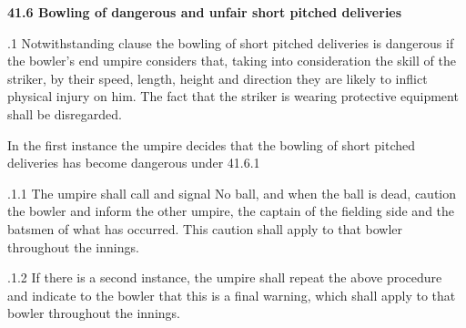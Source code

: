 \documentclass[12pt]{article}
\begin{document}
\vspace{\baselineskip}
{\fontsize{11pt}{13.2pt}\selectfont \textbf{41.6 \tabto{0.47in} Bowling of dangerous and unfair short pitched deliveries}\par}\par


\vspace{\baselineskip}
\begin{adjustwidth}{0.5in}{0.29in}
{\fontsize{9pt}{10.8pt}.1 \tabto{0.49in} Notwithstanding clause the bowling of short pitched deliveries is dangerous if the bowler’s end umpire considers that, taking into consideration the skill of the striker, by their speed, length, height and direction they are likely to inflict physical injury on him. The fact that the striker is wearing protective equipment shall be disregarded.\par}\par

\end{adjustwidth}


\vspace{\baselineskip}
\begin{adjustwidth}{0.5in}{0.15in}
{\fontsize{9pt}{10.8pt}\selectfont In the first instance the umpire decides that the bowling of short pitched deliveries has become dangerous under 41.6.1\par}\par

\end{adjustwidth}


\vspace{\baselineskip}
\begin{adjustwidth}{1.18in}{0.11in}
{\fontsize{9pt}{10.8pt}.1.1 \tabto{1.17in} The umpire shall call and signal No ball, and when the ball is dead, caution the bowler and inform the other umpire, the captain of the fielding side and the batsmen of what has occurred. This caution shall apply to that bowler throughout the innings.\par}\par

\end{adjustwidth}


\vspace{\baselineskip}
\begin{adjustwidth}{1.18in}{0.18in}
{\fontsize{9pt}{10.8pt}.1.2 \tabto{1.17in} If there is a second instance, the umpire shall repeat the above procedure and indicate to the bowler that this is a final warning, which shall apply to that bowler throughout the innings.\par}\par

\end{adjustwidth}
\end{document}
